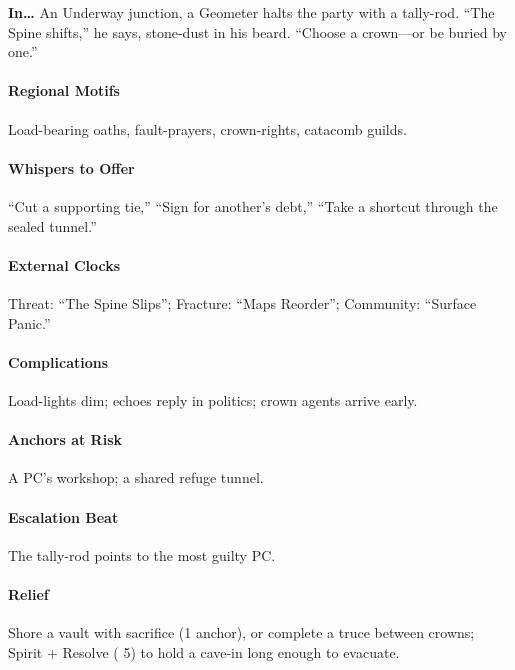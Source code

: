 \textbf{In…} An Underway junction, a Geometer halts the party with a tally-rod. ``The Spine shifts,'' he says, stone-dust in his beard. ``Choose a crown—or be buried by one.''
\paragraph{Regional Motifs} Load-bearing oaths, fault-prayers, crown-rights, catacomb guilds.
\paragraph{Whispers to Offer} ``Cut a supporting tie,'' ``Sign for another’s debt,'' ``Take a shortcut through the sealed tunnel.''
\paragraph{External Clocks} Threat: ``The Spine Slips''; Fracture: ``Maps Reorder''; Community: ``Surface Panic.''
\paragraph{Complications} Load-lights dim; echoes reply in politics; crown agents arrive early.
\paragraph{Anchors at Risk} A PC’s workshop; a shared refuge tunnel.
\paragraph{Escalation Beat} The tally-rod points to the most guilty PC.
\paragraph{Relief} Shore a vault with sacrifice (1 anchor), or complete a truce between crowns; Spirit + Resolve (\DV{} 5) to hold a cave-in long enough to evacuate.

